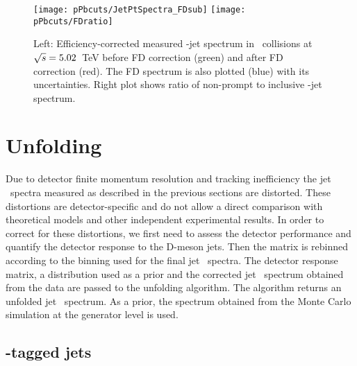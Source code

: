 \begin{figure}[bth]
\centering
\texttt{[image: pPbcuts/JetPtSpectra\_FDsub]}
\texttt{[image: pPbcuts/FDratio]}
\caption{Left: Efficiency-corrected measured \Dzero-jet spectrum in \pp\ collisions at $\sqrt{s}=5.02$~TeV before FD correction (green) and after FD correction (red). The FD spectrum is also plotted (blue) with its uncertainties. Right plot shows ratio of non-prompt to inclusive \Dzero-jet spectrum.}
\label{fig:pPbFD_corr_Dzero}
\end{figure}



\section{Unfolding}
\label{sect:unfResults}

Due to detector finite momentum resolution and tracking inefficiency the jet \pt\ spectra measured as described
in the previous sections are distorted. These distortions are detector-specific and do not allow a direct comparison
with theoretical models and other independent experimental results.
In order to correct for these distortions, we first need to assess the detector performance and quantify
the detector response to the D-meson jets. 
Then the matrix is rebinned according to the binning used for the final jet \pt\ spectra. The detector response matrix, a distribution used as a prior and the corrected jet \pt\ spectrum obtained from the data are passed to the unfolding algorithm. The algorithm returns an unfolded jet \pt\ spectrum. As a prior, the spectrum obtained from the Monte Carlo simulation at the generator level is used.


\subsection{\Dzero-tagged jets}

